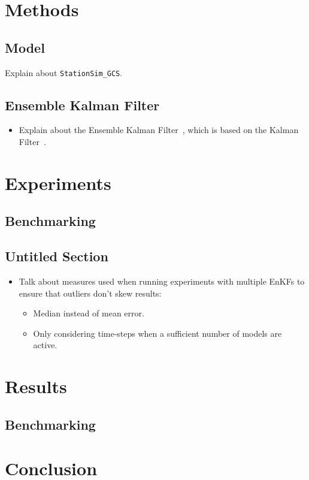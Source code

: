 \documentclass{article}
\begin{document}
\section{Methods}\label{sec:methods}

\subsection{Model}\label{sub:methods:model}

Explain about \texttt{StationSim\_GCS}.

\subsection{Ensemble Kalman Filter}\label{sub:methods:enkf}

\begin{itemize}
    \item Explain about the Ensemble Kalman Filter~\citep{evensen2003ensemble},
        which is based on the Kalman Filter~\citep{kalman1960new}.
\end{itemize}

\section{Experiments}\label{sec:exp}

\subsection{Benchmarking}\label{sub:exp:bench}

\subsection{Untitled Section}

\begin{itemize}
    \item Talk about measures used when running experiments with multiple EnKFs
        to ensure that outliers don't skew results:
    \begin{itemize}
        \item Median instead of mean error.
        \item Only considering time-steps when a sufficient number of models are
            active.
    \end{itemize}
\end{itemize}

\section{Results}\label{sec:results}

\subsection{Benchmarking}\label{sub:results:bench}

\section{Conclusion}\label{sec:conc}



\end{document}
